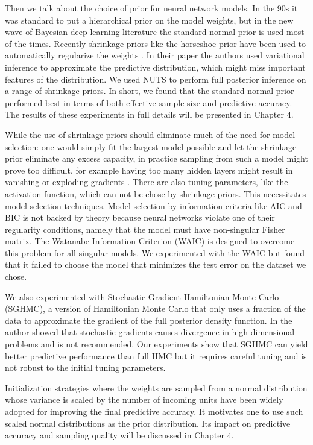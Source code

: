 \documentclass[12pt]{report}
\begin{document}
Then we talk about the choice of prior for neural network models. In the 90s it was standard to put a hierarchical prior on the model weights, but in the new wave of Bayesian deep learning literature the standard normal prior is used most of the times. Recently shrinkage priors like the horseshoe prior have been used to automatically regularize the weights \cite{ghosh2017model}. In their paper the authors used variational inference to approximate the predictive distribution, which might miss important features of the  distribution. We used NUTS to perform full posterior inference on a range of shrinkage priors. In short, we found that the standard normal prior performed best in terms of both effective sample size and predictive accuracy. The results of these experiments in full details will be presented in Chapter 4.

While the use of shrinkage priors should eliminate much of the need for model selection: one would simply fit the largest model possible and let the shrinkage prior eliminate any excess capacity, in practice sampling from such a model might prove too difficult, for example having too many hidden layers might result in vanishing or exploding gradients \cite{bengio1994learning}. There are also tuning parameters, like the activation function, which can not be chose by shrinkage priors. This necessitates model selection techniques. Model selection by information criteria like AIC and BIC is not backed by theory because neural networks violate one of their regularity conditions, namely that the model must have non-singular Fisher matrix. The Watanabe Information Criterion (WAIC) is designed to overcome this problem for all singular models. We experimented with the WAIC but found that it failed to choose the model that minimizes the test error on the dataset we chose. 

We also experimented with Stochastic Gradient Hamiltonian Monte Carlo (SGHMC), a version of Hamiltonian Monte Carlo that only uses a fraction of the data to approximate the gradient of the full posterior density function. In \cite{betancourt2015fundamental} the author showed that stochastic gradients causes divergence in high dimensional problems and is not recommended. Our experiments show that SGHMC can yield better predictive performance than full HMC but it requires careful tuning and is not robust to the initial tuning parameters. 

Initialization strategies where the weights are sampled from a normal distribution whose variance is scaled by the number of incoming units have been widely adopted for improving the final predictive accuracy. It motivates one to use such scaled normal distributions as the prior distribution. Its impact on predictive accuracy and sampling quality will be discussed in Chapter 4. 
\end{document}
